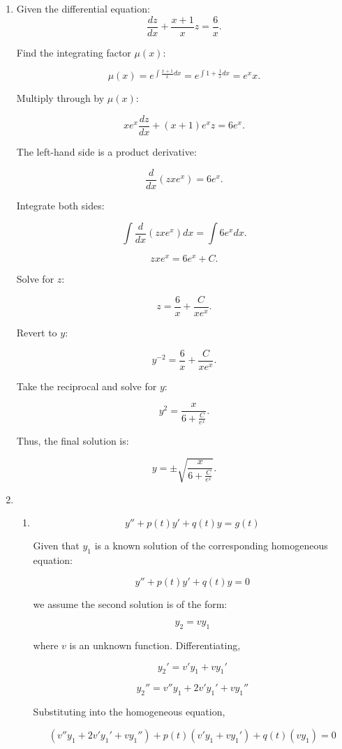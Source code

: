 \documentclass[12pt]{article}
\begin{document}
\begin{enumerate}
\item 
Given the differential equation:
\[
\frac{dz}{dx} + \frac{x + 1}{x}z = \frac{6}{x}.
\]

Find the integrating factor \( \mu(x) \):

\[
\mu(x) = e^{\int \frac{x + 1}{x} dx} = e^{\int 1 + \frac{1}{x} dx} = e^{x} x.
\]

Multiply through by \( \mu(x) \):

\[
xe^x \frac{dz}{dx} + (x+1)e^x z = 6e^x.
\]

The left-hand side is a product derivative:

\[
\frac{d}{dx} \left( zxe^x \right) = 6e^x.
\]

Integrate both sides:

\[
\int \frac{d}{dx} \left( zxe^x \right) dx = \int 6e^x dx.
\]

\[
zxe^x = 6e^x + C.
\]

Solve for \( z \):

\[
z = \frac{6}{x} + \frac{C}{xe^x}.
\]

Revert to \( y \):

\[
y^{-2} = \frac{6}{x} + \frac{C}{xe^x}.
\]

Take the reciprocal and solve for \( y \):

\[
y^2 = \frac{x}{6 + \frac{C}{e^x}}.
\]

Thus, the final solution is:

\[
y = \pm \sqrt{\frac{x}{6 + \frac{C}{e^x}}}.
\]


\item 
\begin{enumerate}
    \item \[
y'' + p(t) y' + q(t) y = g(t)
\]

Given that \( y_1 \) is a known solution of the corresponding homogeneous equation:

\[
y'' + p(t) y' + q(t) y = 0
\]

we assume the second solution is of the form:

\[
y_2 = v y_1
\]

where \( v \) is an unknown function. Differentiating,

\[
y_2' = v' y_1 + v y_1'
\]

\[
y_2'' = v'' y_1 + 2 v' y_1' + v y_1''
\]

Substituting into the homogeneous equation,

\[
(v'' y_1 + 2 v' y_1' + v y_1'') + p(t)(v' y_1 + v y_1') + q(t) (v y_1) = 0
\]


\end{enumerate}
\end{enumerate}
\end{document}
